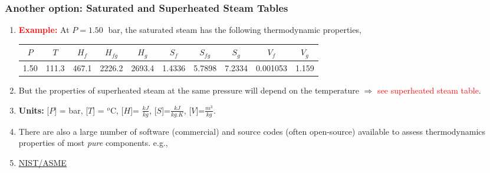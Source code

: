 \documentclass[10pt,compress,handout,ignorenonframetext]{beamer}
\begin{document}
\begin{frame}
  \frametitle{Another option: Saturated and Superheated Steam Tables}
\noindent
\begin{enumerate}
\item <2-> {\bf \textcolor{red}{Example:}} At $P=1.50\;$ bar, the saturated steam has the following thermodynamic properties,
\tiny
\begin{center}
\begin{tabular}{||c|c|c c c|c c c|c c||} 
\hline\hline
$P$ & $T$ & $H_{f}$ &  $H_{fg}$ & $H_{g}$ & $S_{f}$ &  $S_{fg}$ &  $S_{g}$ & $V_{f}$ & $V_{g}$ \\ 
\hline
1.50 & 111.3 & 467.1 & 2226.2 & 2693.4 & 1.4336 & 5.7898 & 7.2334 & 0.001053 & 1.159 \\
\hline
\end{tabular}
\end{center}

\item <3-> But the properties of superheated steam at the same pressure will depend on the temperature $\Rightarrow$ \textcolor{red}{see superheated steam table}.

\item <2-> {\bf Units:} [$P$] = bar, [$T$] = $^{o}$C, [$H$]= $\frac{kJ}{kg}$, [$S$]=$\frac{kJ}{kg.K}$, [$V$]=$\frac{m^{3}}{kg}$.
\item<4-> There are also a large number of software (commercial) and source codes (often open-source) available to assess thermodynamics properties of most {\it pure} components. e.g., 
\item<4-> \href{http://www.nist.gov/srd/nist10.cfm}{NIST/ASME}

\end{enumerate}

\end{frame}
\end{document}
